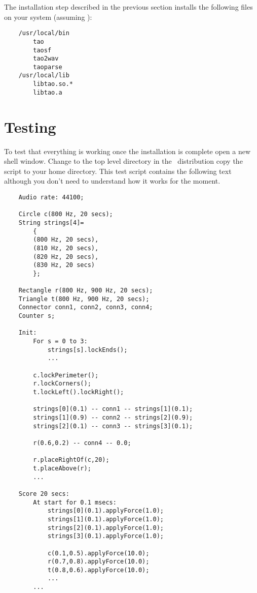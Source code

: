The installation step described in the previous section installs the
following files on your system (assuming ):

\begin{verbatim}
    /usr/local/bin
        tao
        taosf
        tao2wav
        taoparse
    /usr/local/lib
        libtao.so.*
        libtao.a
\end{verbatim}

\section{Testing \tao}
To test that everything is working once the installation is complete open
a new shell window. Change to the top level directory in the \tao\
distribution copy the script  to your home
directory. This test script contains the following text although you don't
need to understand how it works for the moment.

\begin{verbatim}
    Audio rate: 44100;

    Circle c(800 Hz, 20 secs);
    String strings[4]=
        {
        (800 Hz, 20 secs),
        (810 Hz, 20 secs),
        (820 Hz, 20 secs),
        (830 Hz, 20 secs)
        };

    Rectangle r(800 Hz, 900 Hz, 20 secs);
    Triangle t(800 Hz, 900 Hz, 20 secs);
    Connector conn1, conn2, conn3, conn4;
    Counter s;

    Init:
        For s = 0 to 3:
            strings[s].lockEnds();
            ...

        c.lockPerimeter();
        r.lockCorners();
        t.lockLeft().lockRight();

        strings[0](0.1) -- conn1 -- strings[1](0.1);
        strings[1](0.9) -- conn2 -- strings[2](0.9);
        strings[2](0.1) -- conn3 -- strings[3](0.1);

        r(0.6,0.2) -- conn4 -- 0.0;

        r.placeRightOf(c,20);
        t.placeAbove(r);
        ...

    Score 20 secs:
        At start for 0.1 msecs:
            strings[0](0.1).applyForce(1.0);
            strings[1](0.1).applyForce(1.0);
            strings[2](0.1).applyForce(1.0);
            strings[3](0.1).applyForce(1.0);

            c(0.1,0.5).applyForce(10.0);
            r(0.7,0.8).applyForce(10.0);
            t(0.8,0.6).applyForce(10.0);
            ...
        ...
\end{verbatim}


